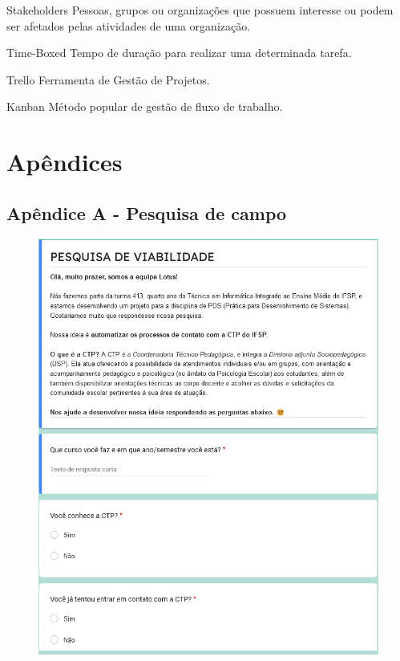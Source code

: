 \documentclass[12pt,a4paper]{article}
\begin{document}
\begin{center}
\justifying
    Stakeholders 
        Pessoas, grupos ou organizações que possuem interesse ou podem ser afetados pelas atividades de uma organização. 
\end{center}

\begin{center}
\justifying
    Time-Boxed 
        Tempo de duração para realizar uma determinada tarefa. 
\end{center}

\begin{center}
\justifying
    Trello 
        Ferramenta de Gestão de Projetos. 
\end{center}

\begin{center}
\justifying
    Kanban Método 
        popular de gestão de fluxo de trabalho.
\end{center}
         
\newpage

\section{Apêndices}
\subsection{Apêndice A - Pesquisa de campo}

\begin{figure}[H]
    \centering
     \includegraphics[width=15cm]{foto1.png}
\end{figure}
\end{document}
